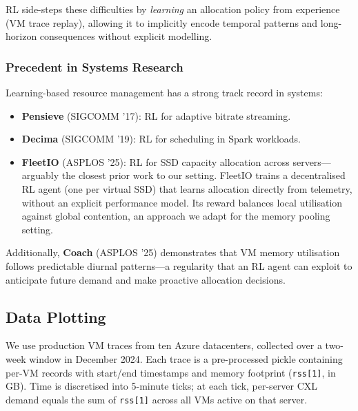 \documentclass[11pt]{article}
\begin{document}
RL side-steps these difficulties by \emph{learning} an allocation policy from
experience (VM trace replay), allowing it to implicitly encode temporal
patterns and long-horizon consequences without explicit modelling.

\subsubsection*{Precedent in Systems Research}

Learning-based resource management has a strong track record in systems:
\begin{itemize}
    \item \textbf{Pensieve} \cite{pensieve2017} (SIGCOMM '17): RL for adaptive bitrate streaming.
    \item \textbf{Decima} \cite{decima2019} (SIGCOMM '19): RL for scheduling in Spark workloads.
    \item \textbf{FleetIO} \cite{fleetio2025} (ASPLOS '25): RL for SSD capacity allocation across
          servers---arguably the closest prior work to our setting.  FleetIO
          trains a decentralised RL agent (one per virtual SSD) that
          learns allocation directly from telemetry, without an explicit
          performance model.  Its reward balances local utilisation against
          global contention, an approach we adapt for the memory pooling
          setting.
\end{itemize}

Additionally, \textbf{Coach} \cite{coach2025} (ASPLOS '25) demonstrates that VM memory
utilisation follows predictable diurnal patterns---a regularity that an RL
agent can exploit to anticipate future demand and make proactive allocation
decisions.

\subsection{Data Plotting}
\label{sec:data_plotting}

We use production VM traces from ten Azure datacenters, collected over a
two-week window in December 2024.  Each trace is a pre-processed pickle
containing per-VM records with start/end timestamps and memory footprint
(\texttt{rss[1]}, in GB).  Time is discretised into 5-minute ticks; at each
tick, per-server CXL demand equals the sum of \texttt{rss[1]} across all VMs
active on that server.
\end{document}
